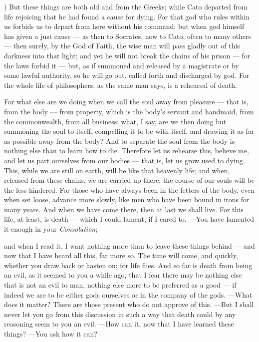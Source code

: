  ) But these things are both old and from the Greeks; while Cato departed from life rejoicing that he had found a cause for dying. For that god who rules within us forbids us to depart from here without his command; but when god himself has given a just cause — as then to Socrates, now to Cato, often to many others — then surely, by the God of Faith, the wise man will pass gladly out of this darkness into that light; and yet he will not break the chains of his prison — for the laws forbid it — but, as if summoned and released by a magistrate or by some lawful authority, so he will go out, called forth and discharged by god. For the whole life of philosophers, as the same man says, is a rehearsal of death.

 For what else are we doing when we call the soul away from pleasure — that is, from the body — from property, which is the body's servant and handmaid, from the commonwealth, from all business: what, I say, are we then doing but summoning the soul to itself, compelling it to be with itself, and drawing it as far as possible away from the body? And to separate the soul from the body is nothing else than to learn how to die. Therefore let us rehearse this, believe me, and let us part ourselves from our bodies — that is, let us grow used to dying. This, while we are still on earth, will be like that heavenly life; and when, released from these chains, we are carried up there, the course of our souls will be the less hindered. For those who have always been in the fetters of the body, even when set loose, advance more slowly, like men who have been bound in irons for many years. And when we have come there, then at last we shall live. For this life, at least, is death — which I could lament, if I cared to. —You have lamented it enough in your \textit{Consolation};

 and when I read it, I want nothing more than to leave these things behind — and now that I have heard all this, far more so. The time will come, and quickly, whether you draw back or hasten on; for life flies. And so far is death from being an evil, as it seemed to you a while ago, that I fear there may be nothing else that is not an evil to man, nothing else more to be preferred as a good — if indeed we are to be either gods ourselves or in the company of the gods. —What does it matter? There are those present who do not approve of this. —But I shall never let you go from this discussion in such a way that death could by any reasoning seem to you an evil. —How can it, now that I have learned these things? —You ask how it can?

